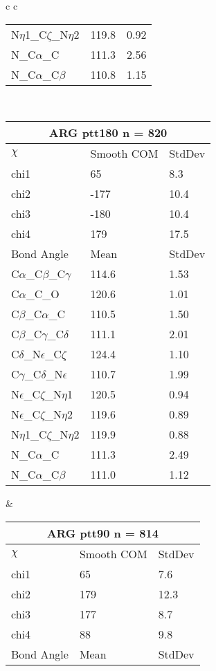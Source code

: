 \begin{longtable}{ c c }
\begin{tabular}{ l l l }
  N$\eta$1\_C$\zeta$\_N$\eta$2 & 119.8 & 0.92\\
  N\_C$\alpha$\_C & 111.3 & 2.56\\
  N\_C$\alpha$\_C$\beta$ & 110.8 & 1.15\\
  \bottomrule
  \end{tabular}
  \\
  \begin{tabular}{ l l l }
  \toprule
  \multicolumn{3}{c}{ARG \textbf{ptt180} n = 820} \\ \toprule
  $\chi$       & Smooth COM & StdDev \\ \midrule
  chi1 & 65 & 8.3 \\ 
  chi2 & -177 & 10.4 \\ 
  chi3 & -180 & 10.4 \\ 
  chi4 & 179 & 17.5 \\ \midrule
  Bond Angle   & Mean     & StdDev \\ \midrule
  C$\alpha$\_C$\beta$\_C$\gamma$ & 114.6 & 1.53\\
  C$\alpha$\_C\_O & 120.6 & 1.01\\
  C$\beta$\_C$\alpha$\_C & 110.5 & 1.50\\
  C$\beta$\_C$\gamma$\_C$\delta$ & 111.1 & 2.01\\
  C$\delta$\_N$\epsilon$\_C$\zeta$ & 124.4 & 1.10\\
  C$\gamma$\_C$\delta$\_N$\epsilon$ & 110.7 & 1.99\\
  N$\epsilon$\_C$\zeta$\_N$\eta$1 & 120.5 & 0.94\\
  N$\epsilon$\_C$\zeta$\_N$\eta$2 & 119.6 & 0.89\\
  N$\eta$1\_C$\zeta$\_N$\eta$2 & 119.9 & 0.88\\
  N\_C$\alpha$\_C & 111.3 & 2.49\\
  N\_C$\alpha$\_C$\beta$ & 111.0 & 1.12\\
  \bottomrule
  \end{tabular}
  &
  \begin{tabular}{ l l l }
  \toprule
  \multicolumn{3}{c}{ARG \textbf{ptt90} n = 814} \\ \toprule
  $\chi$       & Smooth COM & StdDev \\ \midrule
  chi1 & 65 & 7.6 \\ 
  chi2 & 179 & 12.3 \\ 
  chi3 & 177 & 8.7 \\ 
  chi4 & 88 & 9.8 \\ \midrule
  Bond Angle   & Mean     & StdDev \\ \midrule

\end{tabular}
\end{longtable}
